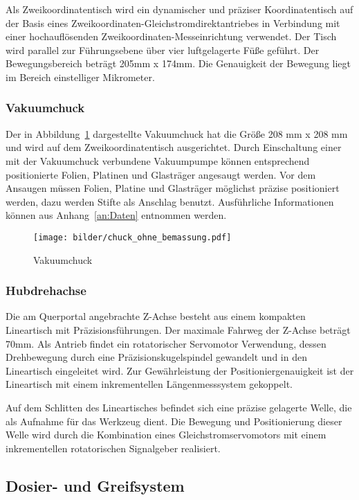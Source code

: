 Als Zweikoordinatentisch wird ein dynamischer und präziser Koordinatentisch auf der Basis eines Zweikoordinaten-Gleichstromdirektantriebes in Verbindung mit einer hochauflösenden Zweikoordinaten-Messeinrichtung verwendet. Der Tisch wird parallel zur Führungsebene über vier luftgelagerte Füße geführt. Der Bewegungsbereich beträgt 205mm x 174mm. Die Genauigkeit der Bewegung liegt im Bereich einstelliger Mikrometer.

\subsubsection{Vakuumchuck}

Der in Abbildung~\ref{fig:Vakuumchuck} dargestellte Vakuumchuck hat die Größe 208 mm x 208 mm und wird auf dem Zweikoordinatentisch ausgerichtet. Durch Einschaltung einer mit der Vakuumchuck verbundene Vakuumpumpe können entsprechend positionierte Folien, Platinen und Glasträger angesaugt werden. Vor dem Ansaugen müssen Folien, Platine und Glasträger möglichst präzise positioniert werden, dazu werden Stifte als Anschlag benutzt. Ausführliche Informationen können aus Anhang~\ref{an:Daten} entnommen werden.
\begin{figure}[H]
    \centering
    \texttt{[image: bilder/chuck\_ohne\_bemassung.pdf]}
    \caption{Vakuumchuck}
    \label{fig:Vakuumchuck}
\end{figure}

\subsubsection{Hubdrehachse}

Die am Querportal angebrachte Z-Achse besteht aus einem kompakten Lineartisch mit Präzisionsführungen. Der maximale Fahrweg der Z-Achse beträgt 70mm. Als Antrieb findet ein rotatorischer Servomotor Verwendung, dessen Drehbewegung durch eine Präzisionskugelspindel gewandelt und in den Lineartisch eingeleitet wird. Zur Gewährleistung der Positioniergenauigkeit ist der Lineartisch mit einem inkrementellen Längenmesssystem gekoppelt.

Auf dem Schlitten des Lineartisches befindet sich eine präzise gelagerte Welle, die als Aufnahme für das Werkzeug dient. Die Bewegung und Positionierung dieser Welle wird durch die Kombination eines Gleichstromservomotors mit einem inkrementellen rotatorischen Signalgeber realisiert.

\subsection{Dosier- und Greifsystem}

